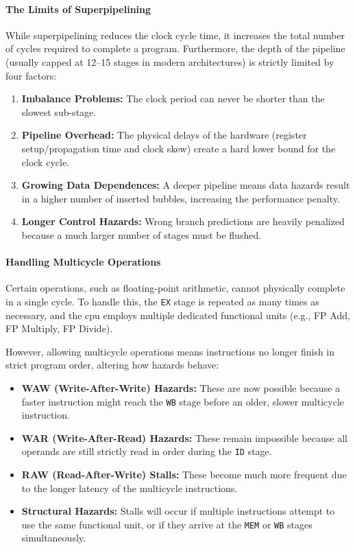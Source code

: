 \paragraph{The Limits of Superpipelining}
While superpipelining reduces the clock cycle time, it increases the total number of cycles required to complete a program. Furthermore, the depth of the pipeline (usually capped at 12--15 stages in modern architectures) is strictly limited by four factors:
\begin{enumerate}
    \item \textbf{Imbalance Problems:} The clock period can never be shorter than the slowest sub-stage.
    \item \textbf{Pipeline Overhead:} The physical delays of the hardware (register setup/propagation time and clock skew) create a hard lower bound for the clock cycle.
    \item \textbf{Growing Data Dependences:} A deeper pipeline means data hazards result in a higher number of inserted bubbles, increasing the performance penalty.
    \item \textbf{Longer Control Hazards:} Wrong branch predictions are heavily penalized because a much larger number of stages must be flushed.
\end{enumerate}

\paragraph{Handling Multicycle Operations}
Certain operations, such as floating-point arithmetic, cannot physically complete in a single cycle. To handle this, the \texttt{EX} stage is repeated as many times as necessary, and the \gls{cpu} employs multiple dedicated functional units (e.g., FP Add, FP Multiply, FP Divide). 

However, allowing multicycle operations means instructions no longer finish in strict program order, altering how hazards behave:
\begin{itemize}
    \item \textbf{WAW (Write-After-Write) Hazards:} These are now possible because a faster instruction might reach the \texttt{WB} stage before an older, slower multicycle instruction.
    \item \textbf{WAR (Write-After-Read) Hazards:} These remain impossible because all operands are still strictly read in order during the \texttt{ID} stage.
    \item \textbf{RAW (Read-After-Write) Stalls:} These become much more frequent due to the longer latency of the multicycle instructions.
    \item \textbf{Structural Hazards:} Stalls will occur if multiple instructions attempt to use the same functional unit, or if they arrive at the \texttt{MEM} or \texttt{WB} stages simultaneously.
\end{itemize}

